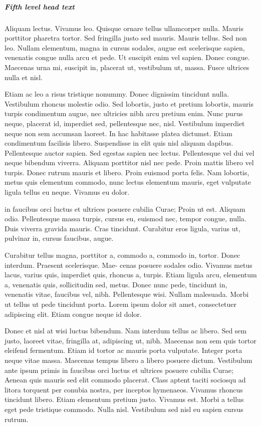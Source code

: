 \documentclass[APA,STIX1COL]{WileyNJD-v2}
\begin{document}
\subparagraph{Fifth level head text}

Aliquam lectus. Vivamus leo. Quisque ornare tellus ullamcorper nulla. Mauris porttitor pharetra
tortor. Sed fringilla justo sed mauris. Mauris tellus. Sed non leo. Nullam elementum, magna in cursus sodales, augue
est scelerisque sapien, venenatis congue nulla arcu et pede. Ut suscipit enim vel sapien. Donec congue. Maecenas
urna mi, suscipit in, placerat ut, vestibulum ut, massa. Fusce ultrices nulla et nisl.

Etiam ac leo a risus tristique nonummy. Donec dignissim tincidunt nulla. Vestibulum rhoncus molestie odio. Sed
lobortis, justo et pretium lobortis, mauris turpis condimentum augue, nec ultricies nibh arcu pretium enim. Nunc
purus neque, placerat id, imperdiet sed, pellentesque nec, nisl. Vestibulum imperdiet neque non sem accumsan laoreet.
In hac habitasse platea dictumst. Etiam condimentum facilisis libero. Suspendisse in elit quis nisl aliquam dapibus.
Pellentesque auctor sapien. Sed egestas sapien nec lectus. Pellentesque vel dui vel neque bibendum viverra. Aliquam
porttitor nisl nec pede. Proin mattis libero vel turpis. Donec rutrum mauris et libero. Proin euismod porta felis.
Nam lobortis, metus quis elementum commodo, nunc lectus elementum mauris, eget vulputate ligula tellus eu neque.
Vivamus eu dolor.

in faucibus orci luctus et ultrices posuere cubilia Curae; Proin ut est. Aliquam odio. Pellentesque massa turpis, cursus
eu, euismod nec, tempor congue, nulla. Duis viverra gravida mauris. Cras tincidunt. Curabitur eros ligula, varius ut,
pulvinar in, cursus faucibus, augue.

Curabitur tellus magna, porttitor a, commodo a, commodo in, tortor. Donec interdum. Praesent scelerisque. Mae-
cenas posuere sodales odio. Vivamus metus lacus, varius quis, imperdiet quis, rhoncus a, turpis. Etiam ligula arcu,
elementum a, venenatis quis, sollicitudin sed, metus. Donec nunc pede, tincidunt in, venenatis vitae, faucibus vel,
nibh. Pellentesque wisi. Nullam malesuada. Morbi ut tellus ut pede tincidunt porta. Lorem ipsum dolor sit amet,
consectetuer adipiscing elit. Etiam congue neque id dolor.

Donec et nisl at wisi luctus bibendum. Nam interdum tellus ac libero. Sed sem justo, laoreet vitae, fringilla at,
adipiscing ut, nibh. Maecenas non sem quis tortor eleifend fermentum. Etiam id tortor ac mauris porta vulputate.
Integer porta neque vitae massa. Maecenas tempus libero a libero posuere dictum. Vestibulum ante ipsum primis in
faucibus orci luctus et ultrices posuere cubilia Curae; Aenean quis mauris sed elit commodo placerat. Class aptent
taciti sociosqu ad litora torquent per conubia nostra, per inceptos hymenaeos. Vivamus rhoncus tincidunt libero.
Etiam elementum pretium justo. Vivamus est. Morbi a tellus eget pede tristique commodo. Nulla nisl. Vestibulum
sed nisl eu sapien cursus rutrum.
\end{document}
